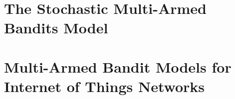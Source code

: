 \setcounter{mtc}{1}
\adjustmtc



\part{The Stochastic Multi-Armed Bandits Model}







\part{Multi-Armed Bandit Models for Internet of Things Networks}








